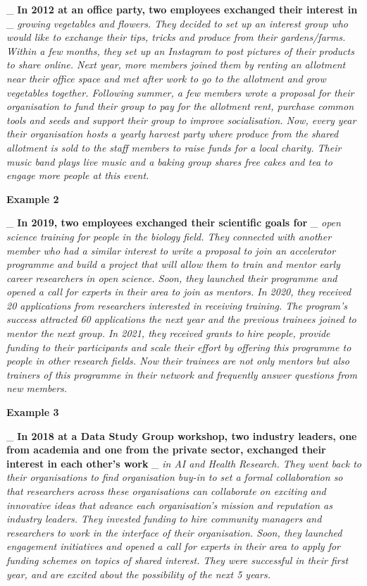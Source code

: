\documentclass[
  letterpaper,
  DIV=11,
  numbers=noendperiod]{scrreport}
\begin{document}
\_ \textbf{In 2012 at an office party, two employees exchanged their
interest in} \_ \emph{growing vegetables and flowers. They decided to
set up an interest group who would like to exchange their tips, tricks
and produce from their gardens/farms. Within a few months, they set up
an Instagram to post pictures of their products to share online. Next
year, more members joined them by renting an allotment near their office
space and met after work to go to the allotment and grow vegetables
together. Following summer, a few members wrote a proposal for their
organisation to fund their group to pay for the allotment rent, purchase
common tools and seeds and support their group to improve socialisation.
Now, every year their organisation hosts a yearly harvest party where
produce from the shared allotment is sold to the staff members to raise
funds for a local charity. Their music band plays live music and a
baking group shares free cakes and tea to engage more people at this
event.}

\textbf{Example 2}

\_ \textbf{In 2019, two employees exchanged their scientific goals for}
\_ \emph{open science training for people in the biology field. They
connected with another member who had a similar interest to write a
proposal to join an accelerator programme and build a project that will
allow them to train and mentor early career researchers in open science.
Soon, they launched their programme and opened a call for experts in
their area to join as mentors. In 2020, they received 20 applications
from researchers interested in receiving training. The program's success
attracted 60 applications the next year and the previous trainees joined
to mentor the next group. In 2021, they received grants to hire people,
provide funding to their participants and scale their effort by offering
this programme to people in other research fields. Now their trainees
are not only mentors but also trainers of this programme in their
network and frequently answer questions from new members.}

\textbf{Example 3}

\_ \textbf{In 2018 at a Data Study Group workshop, two industry leaders,
one from academia and one from the private sector, exchanged their
interest in each other's work} \_ \emph{in AI and Health Research. They
went back to their organisations to find organisation buy-in to set a
formal collaboration so that researchers across these organisations can
collaborate on exciting and innovative ideas that advance each
organisation's mission and reputation as industry leaders. They invested
funding to hire community managers and researchers to work in the
interface of their organisation. Soon, they launched engagement
initiatives and opened a call for experts in their area to apply for
funding schemes on topics of shared interest. They were successful in
their first year, and are excited about the possibility of the next 5
years.}
\end{document}
